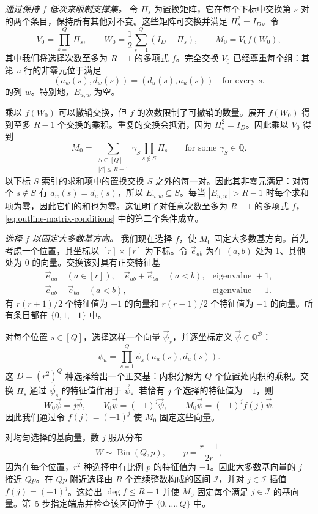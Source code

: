 \documentclass[11pt,reqno]{amsart}
\numberwithin{equation}{section}
\theoremstyle{definition}\newtheorem{definition}[theorem]{定义}
\theoremstyle{remark}\newtheorem{remark}[theorem]{注}
\renewcommand{\le}{\leqslant}
\begin{document}
\smallskip\noindent
\emph{通过保持 $f$ 低次来限制支撑集。}
令 $\Pi_s$ 为置换矩阵，它在每个下标中交换第 $s$ 对的两个条目，保持所有其他对不变。这些矩阵可交换并满足 $\Pi_s^2=I_D$。令
\[
 V_0=\prod_{s=1}^Q\Pi_s,\qquad
 W_0=\frac12\sum_{s=1}^Q(I_D-\Pi_s),\qquad
 M_0=V_0f(W_0),
\]
其中我们将选择次数至多为 $R-1$ 的多项式 $f$。完全交换 $V_0$ 已经尊重每个组：其第 $u$ 行的非零元位于满足
\[
 (a_w(s),d_w(s))=(d_u(s),a_u(s))\quad\text{for every }s.
\]
的列 $w$。特别地，$E_{u,w}$ 为空。

乘以 $f(W_0)$ 可以撤销交换，但 $f$ 的次数限制了可撤销的数量。展开 $f(W_0)$ 得到至多 $R-1$ 个交换的乘积。重复的交换会抵消，因为 $\Pi_s^2=I_D$。因此乘以 $V_0$ 得到
\begin{equation}\label{eq:overview-partial-swaps}
 M_0=\sum_{\substack{S\subseteq[Q]\\|S|\le R-1}}
             \gamma_S\prod_{s\notin S}\Pi_s
 \qquad\text{for some }\gamma_S\in\mathbb Q.
\end{equation}
以下标 $S$ 索引的求和项中的置换交换 $S$ 之外的每一对。因此其非零元满足：对每个 $s\notin S$ 有 $a_w(s)=d_u(s)$，所以 $E_{u,w}\subseteq S$。每当 $|E_{u,w}|>R-1$ 时每个求和项为零，因此它们的和也为零。这证明了对任意次数至多为 $R-1$ 的多项式 $f$，\eqref{eq:outline-matrix-conditions} 中的第二个条件成立。

\smallskip\noindent
\emph{选择 $f$ 以固定大多数基方向。}
我们现在选择 $f$，使 $M_0$ 固定大多数基方向。首先考虑一个位置，其坐标以 $[r]\times[r]$ 为下标。令 $\vec e_{ab}$ 为在 $(a,b)$ 处为 1、其他处为 0 的向量。交换该对具有正交特征基
\[
 \begin{array}{ll}
 \vec e_{aa}\quad(a\in[r]),\quad
 \vec e_{ab}+\vec e_{ba}\quad(a<b),
     &\text{eigenvalue }+1,\\[2pt]
 \vec e_{ab}-\vec e_{ba}\quad(a<b),
     &\text{eigenvalue }-1.
 \end{array}
\]
有 $r(r+1)/2$ 个特征值为 $+1$ 的向量和 $r(r-1)/2$ 个特征值为 $-1$ 的向量。所有条目都在 $\{0,1,-1\}$ 中。

对每个位置 $s\in[Q]$，选择这样一个向量 $\vec\psi_s$，并逐坐标定义 $\vec\psi\in\mathbb Q^{\mathcal B}$：
\[
 \psi_u=\prod_{s=1}^Q\psi_s(a_u(s),d_u(s)).
\]
这 $D=(r^2)^Q$ 种选择给出一个正交基：内积分解为 $Q$ 个位置处内积的乘积。交换 $\Pi_s$ 通过 $\vec\psi_s$ 的特征值作用于 $\vec\psi$。若恰有 $j$ 个选择的特征值为 $-1$，则
\[
 W_0\vec\psi=j\vec\psi,\qquad
 V_0\vec\psi=(-1)^j\vec\psi,\qquad
 M_0\vec\psi=(-1)^jf(j)\vec\psi.
\]
因此我们通过令 $f(j)=(-1)^j$ 使 $M_0$ 固定这些向量。

对均匀选择的基向量，数 $j$ 服从分布
\[
 W\sim\operatorname{Bin}(Q,p),\qquad p=\frac{r-1}{2r},
\]
因为在每个位置，$r^2$ 种选择中有比例 $p$ 的特征值为 $-1$。因此大多数基向量的 $j$ 接近 $Qp$。在 $Qp$ 附近选择由 $R$ 个连续整数构成的区间 $\mathcal I$，并对 $j\in\mathcal I$ 插值 $f(j)=(-1)^j$。这给出 $\deg f\le R-1$ 并使 $M_0$ 固定每个满足 $j\in\mathcal I$ 的基向量。第~5 步指定端点并检查该区间位于 $\{0,\ldots,Q\}$ 中。
\end{document}
